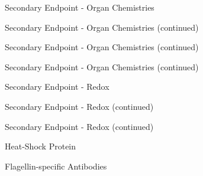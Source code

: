 \documentclass[dvips, 10pt]{article}
\begin{document}
\begin{figure}
\caption{Secondary Endpoint - Organ Chemistries}
\end{figure}
\clearpage

\begin{figure}
\caption{Secondary Endpoint - Organ Chemistries (continued)}
\end{figure}
\clearpage

\begin{figure}
\caption{Secondary Endpoint - Organ Chemistries (continued)}
\end{figure}
\clearpage

\begin{figure}
\caption{Secondary Endpoint - Organ Chemistries (continued)}
\end{figure}
\clearpage

\begin{figure}
\caption{Secondary Endpoint - Redox}
\end{figure}
\clearpage

\begin{figure}
\caption{Secondary Endpoint - Redox (continued)}
\end{figure}
\clearpage

\begin{figure}
\caption{Secondary Endpoint - Redox (continued)}
\end{figure}
\clearpage
\clearpage

\begin{figure}
\caption{Heat-Shock Protein}
\end{figure}
\clearpage

\begin{figure}
\caption{Flagellin-specific Antibodies}
\end{figure}
\clearpage
\end{document}
